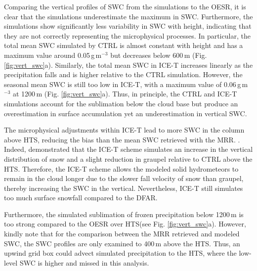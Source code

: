\documentclass{ametsocV5}
\begin{document}
		Comparing the vertical profiles of SWC from the simulations to the OESR, it is clear that the simulations underestimate the maximum in SWC. Furthermore, the simulations show significantly less variability in SWC with height, indicating that they are not correctly representing the microphysical processes. In particular, the total mean SWC simulated by CTRL is almost constant with height and has a maximum value around 0.05\,g\,m$^{-3}$ but decreases below 600\,m (Fig. \ref{fig:vert_swc}a). Similarly, the total mean SWC in ICE-T increases linearly as the precipitation falls and is higher relative to the CTRL simulation. However, the seasonal mean SWC is still too low in ICE-T, with a maximum value of 0.06\,g\,m$^{-3}$ at 1200\,m (Fig. \ref{fig:vert_swc}a). Thus, in principle, the CTRL and ICE-T simulations account for the sublimation below the cloud base but produce an overestimation in surface accumulation yet an underestimation in vertical SWC. 

		The microphysical adjustments within ICE-T lead to more SWC in the column above HTS, reducing the bias than the mean SWC retrieved with the MRR. \citep{engdahl_effects_2020}. Indeed, \citet{engdahl_effects_2020} demonstrated that the ICE-T scheme simulates an increase in the vertical distribution of snow and a slight reduction in graupel relative to CTRL above the HTS. Therefore, the ICE-T scheme allows the modeled solid hydrometeors to remain in the cloud longer due to the slower fall velocity of snow than graupel, thereby increasing the SWC in the vertical. Nevertheless, ICE-T still simulates too much surface snowfall compared to the DFAR. 
		
		Furthermore, the simulated sublimation of frozen precipitation below 1200\,m is too strong compared to the OESR over HTS(see Fig. \ref{fig:vert_swc}a). However, kindly note that for the comparison between the MRR retrieved and modeled SWC, the SWC profiles are only examined to 400\,m above the HTS. Thus, an upwind grid box could advect simulated precipitation to the HTS, where the low-level SWC is higher and missed in this analysis.
\end{document}
